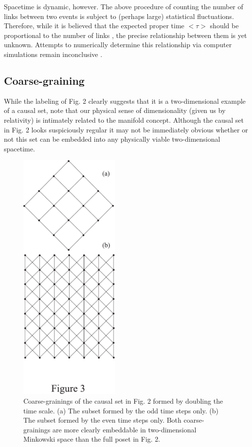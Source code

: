 \documentclass[aps,amssymb,12pt]{revtex4-2}
\begin{document}
Spacetime is dynamic, however. The above procedure of counting the number of
links between two events is subject to (perhaps large) statistical
fluctuations. Therefore, while it is believed that the expected proper time $%
<\tau >$ should be proportional to the number of links \cite{29}, the precise
relationship between them is yet unknown. Attempts to numerically determine
this relationship via computer simulations remain inconclusive \cite{28}.

\subsection{Coarse-graining}

While the labeling of Fig. 2 clearly suggests that it is a two-dimensional
example of a causal set, note that our physical sense of dimensionality
(given us by relativity) is intimately related to the manifold concept.
Although the causal set in Fig. 2 looks suspiciously regular it may not be
immediately obvious whether or not this set can be embedded into any
physically viable two-dimensional spacetime.

\begin{figure}[tp]
\centerline{\includegraphics[height=5in]{figure3.pdf}}
\caption{Coarse-grainings of the causal set in Fig. 2 formed by
doubling the time scale. (a) The subset formed by the odd time steps only.
(b) The subset formed by the even time steps only. Both coarse-grainings are
more clearly embeddable in two-dimensional Minkowski space than the full
poset in Fig. 2.}
\end{figure}
\end{document}
